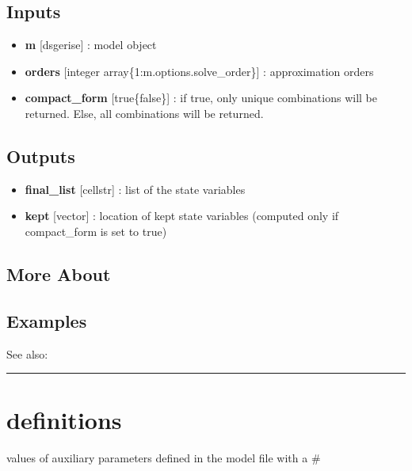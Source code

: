 \documentclass[letterpaper,10pt,english]{sphinxmanual}
\begin{document}
\subsection{Inputs}
\label{classes/models/@dsge/dsge:id22}\begin{itemize}
\item {} 
\textbf{m} {[}dsge\textbar{}rise{]} : model object

\item {} 
\textbf{orders} {[}integer array\textbar{}\{1:m.options.solve\_order\}{]} : approximation
orders

\item {} 
\textbf{compact\_form} {[}true\textbar{}\{false\}{]} : if true, only unique combinations
will be returned. Else, all combinations will be returned.

\end{itemize}


\subsection{Outputs}
\label{classes/models/@dsge/dsge:id23}\begin{itemize}
\item {} 
\textbf{final\_list} {[}cellstr{]} : list of the state variables

\item {} 
\textbf{kept} {[}vector{]} : location of kept state variables (computed only if
compact\_form is set to true)

\end{itemize}


\subsection{More About}
\label{classes/models/@dsge/dsge:id24}

\subsection{Examples}
\label{classes/models/@dsge/dsge:id25}
See also:


\bigskip\hrule{}\bigskip



\section{definitions}
\label{classes/models/@dsge/dsge:definitions}\label{classes/models/@dsge/dsge:id26}
values of auxiliary parameters defined in the model file with a \#
\end{document}
